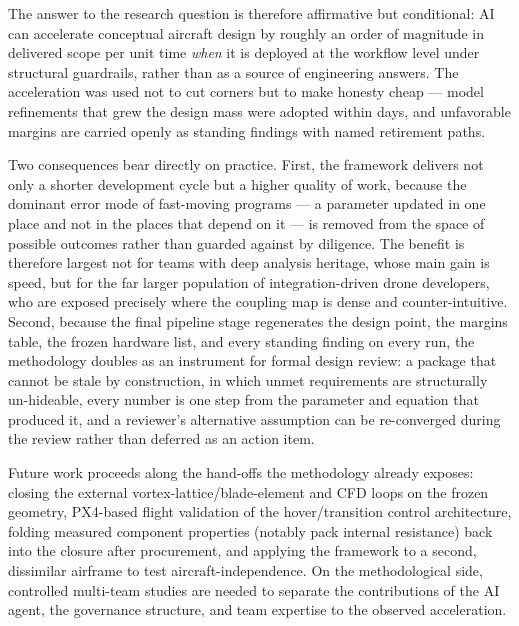 The answer to the research question is therefore affirmative but
conditional: AI can accelerate conceptual aircraft design by roughly
an order of magnitude in delivered scope per unit time \emph{when} it
is deployed at the workflow level under structural guardrails, rather
than as a source of engineering answers. The acceleration was used not
to cut corners but to make honesty cheap --- model refinements that
grew the design mass were adopted within days, and unfavorable margins
are carried openly as standing findings with named retirement paths.

Two consequences bear directly on practice. First, the framework
delivers not only a shorter development cycle but a higher quality of
work, because the dominant error mode of fast-moving programs --- a
parameter updated in one place and not in the places that depend on it
--- is removed from the space of possible outcomes rather than guarded
against by diligence. The benefit is therefore largest not for teams
with deep analysis heritage, whose main gain is speed, but for the far
larger population of integration-driven drone developers, who are
exposed precisely where the coupling map is dense and
counter-intuitive. Second, because the final pipeline stage regenerates
the design point, the margins table, the frozen hardware list, and
every standing finding on every run, the methodology doubles as an
instrument for formal design review: a package that cannot be stale by
construction, in which unmet requirements are structurally un-hideable,
every number is one step from the parameter and equation that produced
it, and a reviewer's alternative assumption can be re-converged during
the review rather than deferred as an action item.

Future work proceeds along the hand-offs the methodology already
exposes: closing the external vortex-lattice/blade-element and CFD
loops on the frozen geometry, PX4-based flight validation of the
hover/transition control architecture, folding measured component
properties (notably pack internal resistance) back into the closure
after procurement, and applying the framework to a second, dissimilar
airframe to test aircraft-independence. On the methodological side,
controlled multi-team studies are needed to separate the contributions
of the AI agent, the governance structure, and team expertise to the
observed acceleration.
